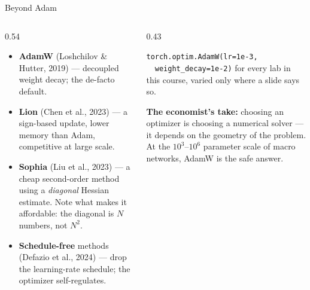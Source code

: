 \begin{frame}{Beyond Adam}
\begin{columns}[T]
\begin{column}{0.54\textwidth}
\small
\begin{itemize}\small\setlength{\itemsep}{1.3mm}
  \item \textbf{AdamW} (Loshchilov \& Hutter, 2019) --- decoupled weight decay; the de-facto default.
  \item \textbf{Lion} (Chen et al., 2023) --- a sign-based update, lower memory than Adam, competitive at large scale.
  \item \textbf{Sophia} (Liu et al., 2023) --- a cheap second-order method using a \emph{diagonal} Hessian estimate. Note what makes it affordable: the diagonal is $N$ numbers, not $N^{2}$.
  \item \textbf{Schedule-free} methods (Defazio et al., 2024) --- drop the learning-rate schedule; the optimizer self-regulates.
\end{itemize}
\end{column}
\begin{column}{0.43\textwidth}
\begin{takeawaybox}[title=\textbf{Course default}]\small
\texttt{torch.optim.AdamW(lr=1e-3,}\\
\texttt{\ \ weight\_decay=1e-2)}
\medskip
for every lab in this course, varied only where a slide says so.
\end{takeawaybox}
\medskip
\begin{conceptbox}\footnotesize
\textbf{The economist's take:} choosing an optimizer is choosing a numerical solver --- it depends on the geometry of the problem. At the $10^{3}$--$10^{6}$ parameter scale of macro networks, AdamW is the safe answer.
\end{conceptbox}
\end{column}
\end{columns}
\end{frame}

